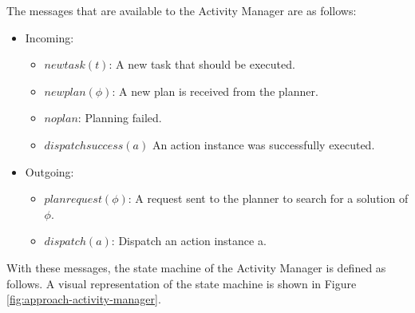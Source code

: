 The messages that are available to the Activity Manager are as follows:
\begin{itemize}
    \item Incoming:
    \begin{itemize}
        \item $newtask(t)$: A new task that should be executed. 
        \item $newplan(\phi)$: A new plan is received from the planner.
        \item $noplan$: Planning failed.
        \item $dispatchsuccess(a)$ An action instance was successfully executed.
    \end{itemize}
    \item Outgoing:
    \begin{itemize}
        \item $planrequest(\phi)$: A request sent to the planner to search for a solution of $\phi$.
        \item $dispatch(a)$: Dispatch an action instance a.
    \end{itemize}
\end{itemize}

With these messages, the state machine of the Activity Manager is defined as follows.
A visual representation of the state machine is shown in Figure \ref{fig:approach-activity-manager}.

